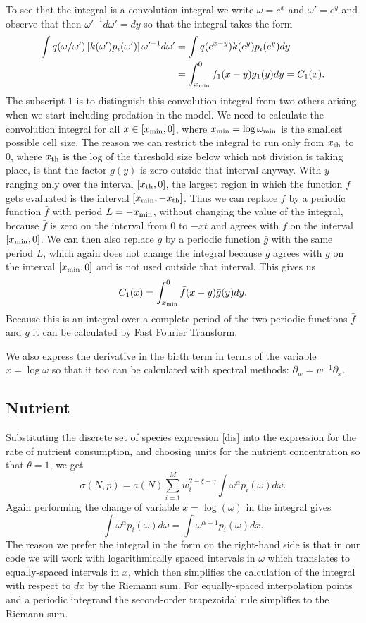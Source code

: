 \documentclass[a4paper,12pt]{article}
\newcommand{\w}{\omega}
\newcommand{\wmin}{\w_{\rm{min}}}
\newcommand{\xmin}{x_{\rm{min}}}
\newcommand{\xt}{x_{\rm{th}}}
\begin{document}
To see that the integral is a convolution integral we write $\w=e^x$ and $\w'=e^y$ and 
observe that then $\w'^{-1}d\w'=dy$ so that the integral takes the form
\[\begin{split}
\int q(\w/\w')\left[k(\w')p_i(\w')\right]\w'^{-1}d\w'&=\int q(e^{x-y})k(e^y)p_i(e^y)dy\\
&=\int_{\xmin}^0 f_1(x-y)g_1(y)dy=C_1(x).
\end{split}\]
The subscript $1$ is to distinguish this convolution integral from two others arising when we start
including predation in the model.
We need to calculate the convolution integral for all $x\in[\xmin,0]$, where
$\xmin=\log\wmin$ is the smallest possible cell size. 
The reason we can restrict the integral to run only from $\xt$ to $0$,
where $\xt$ is the log of the threshold size below which not division is
taking place, is that the factor $g(y)$ is zero outside that interval anyway.  
With $y$ ranging only over the interval $[\xt,0]$, the largest region in
which the function $f$ gets evaluated is the interval $[\xmin, -\xt]$. Thus we can replace
$f$ by a periodic function $\bar{f}$ with period $L=-\xmin$, without changing the value
of the integral, because $\bar{f}$ is zero on the interval from $0$ to $-xt$ and agrees with
$f$ on the interval $[\xmin, 0]$. We can then
also replace $g$ by a periodic function $\bar{g}$ with the same period $L$, which again
does not change the integral because $\bar{g}$ agrees with $g$ on the interval $[\xmin, 0]$
and is not used outside that interval. This gives us 
\[
C_1(x)=\int_{\xmin}^0\bar{f}(x-y)\bar{g}(y)dy.
\]
Because this is an integral over a complete period of the two periodic functions $\bar{f}$ and
$\bar{g}$ it can be calculated by Fast Fourier Transform. 

We also express the derivative in the birth term in terms of the variable $x=\log\w$ so that
it too can be calculated with spectral  methods: $\partial_w=w^{-1}\partial_x$.

\subsection{Nutrient}
Substituting the discrete set of species expression \eqref{dis} into the expression 
\cite[(2.13)]{cuesta_sheldon_2016} for
the rate of nutrient consumption, and choosing units for the nutrient concentration so that $\theta=1$,
we get
\begin{equation}
\sigma(N,p)=a(N)\sum_{i=1}^M w_i^{2-\xi-\gamma}\int\w^\alpha p_i(\w)d\w.
\end{equation}
Again performing the change of variable $x=\log(\w)$ in the integral gives
\[\int\w^\alpha p_i(\w)d\w=\int\w^{\alpha+1} p_i(\w)dx.\]
The reason we prefer the integral in the form on the right-hand side is that in our code
we will work with logarithmically spaced  intervals in $\w$ which translates to equally-spaced
intervals in $x$, which then simplifies the calculation of the integral with respect to $dx$ 
by the Riemann sum. For equally-spaced interpolation points and a periodic integrand the
second-order trapezoidal rule simplifies to the Riemann sum.
\end{document}
